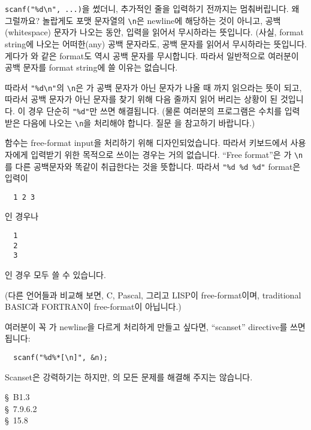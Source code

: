\begin{faq}
	\verb+scanf("%d\n", ...)+을 썼더니, 추가적인 줄을 입력하기 전까지는
	멈춰버립니다.  왜 그럴까요?
\A
	놀랍게도  포맷 문자열의 \verb+\n+은 newline에 해당하는
	것이 아니고,
	공백(whitespace) 문자가 나오는 동안, 입력을 읽어서 무시하라는
	뜻입니다.
	(사실,  format string에 나오는 어떠한(any) 공백 문자라도,
	공백 문자를 읽어서 무시하라는 뜻입니다. 게다가 와 같은
	format도 역시 공백 문자를 무시합니다. 따라서 일반적으로 여러분이
	공백 문자를  format string에 쓸 이유는 없습니다.

	따라서 \verb+"%d\n"+의
	\verb+\n+은 가 공백 문자가 아닌 문자가 나올 때 까지
	읽으라는 뜻이 되고, 따라서 공백 문자가 아닌 문자를 찾기 위해
	다음 줄까지 읽어 버리는 상황이 된 것입니다. 
	이 경우 단순히 \verb+"%d"+만
	쓰면 해결됩니다.  (물론 여러분의 프로그램은 수치를 입력받은 다음에
	나오는 \verb+\n+을 처리해야 합니다.  질문 을 참고하기 바랍니다.)

	 함수는 free-format input을 처리하기 위해 디자인되었습니다.
	따라서 키보드에서 사용자에게 입력받기 위한 목적으로 쓰이는 경우는
	거의 없습니다.  ``Free format''은 가 \verb+\n+를 다른
	공백문자와 똑같이 취급한다는 것을 뜻합니다.
	따라서 \verb+"%d %d %d"+ format은
	입력이
\begin{verbatim}
  1 2 3
\end{verbatim}
	인 경우나
\begin{verbatim}
  1
  2
  3
\end{verbatim}
	인 경우 모두 쓸 수 있습니다.

	(다른 언어들과 비교해 보면, C, Pascal, 그리고 LISP이 free-format이며,
	traditional BASIC과 FORTRAN이 free-format이 아닙니다.)

	여러분이 꼭 가 newline을 다르게 처리하게 만들고 싶다면,
	``scanset'' directive를 쓰면 됩니다:
\begin{verbatim}
  scanf("%d%*[\n]", &n);
\end{verbatim}
	Scanset은 강력하기는 하지만, 의 모든 문제를 해결해 주지는
	않습니다.  

\R
	\cite{kr2} \S\ B1.3  \\
	\cite{c89} \S\ 7.9.6.2 \\
	\cite{hs} \S\ 15.8 
\end{faq}

